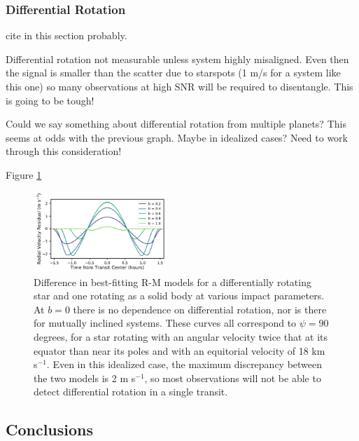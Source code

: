 \documentclass[twocolumn]{aastex63}
\begin{document}
\subsubsection{Differential Rotation}




cite \citet{Giminez06} in this section probably.


Differential rotation not measurable unless system highly misaligned. Even then the signal is smaller than the scatter due to starspots (1 m/s for a system like this one) so many observations at high SNR will be required to disentangle. This is going to be tough!

Could we say something about differential rotation from multiple planets? This seems at odds with the previous graph. Maybe in idealized cases? Need to work through this consideration!


Figure \ref{fig:diff_rot}

\begin{figure}[!tbh]
  \begin{center}
    \includegraphics[width=0.45\textwidth, trim={0cm 0.0cm 0cm 0cm}, clip=true]{../figures/diff_rot.pdf}
   \end{center}
  \caption{Difference in best-fitting R-M models for a differentially rotating star and one rotating as a solid body at various impact parameters. At $b=0$ there is no dependence on differential rotation, nor is there for mutually inclined systems. These curves all correspond to $\psi = 90$ degrees, for a star rotating with an angular velocity twice that at its equator than near its poles and with an equitorial velocity of 18 km s$^{-1}$. Even in this idealized case, the maximum discrepancy between the two models is 2 m s$^{-1}$, so most observations will not be able to detect differential rotation in a single transit. }
  \label{fig:diff_rot}
\end{figure}





\subsection{Conclusions}
\end{document}
